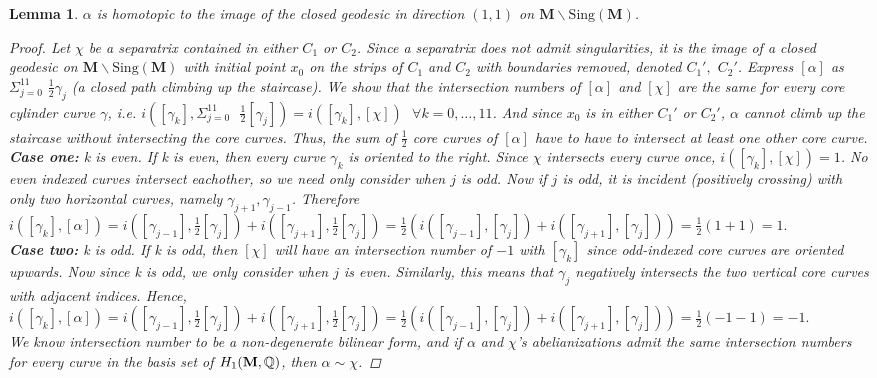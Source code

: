 \documentclass[]{article}
\newtheorem{lem}{Lemma}[section]
\begin{document}
\begin{lem}
$\alpha$ is homotopic to the image of the closed geodesic in direction $(1,1)$ on $\mathbf{M}\backslash\text{Sing}(\mathbf M)$.
\begin{proof}
Let $\chi$ be a separatrix contained in either $C_1$ or $C_2$. Since a separatrix does not admit singularities, it is the image of a closed geodesic on $\mathbf{M}\backslash\text{Sing}(\mathbf M)$ with initial point $x_0$ on the strips of $C_1$ and $C_2$ with boundaries removed, denoted $C_1',$ $C_2'$. Express $[\alpha]$ as $\Sigma^{11}_{j=0}$ $\frac{1}{2}\gamma_j$ (a closed path climbing up the staircase). We show that the intersection numbers of $[\alpha]$ and $[\chi]$ are the same for every core cylinder curve $\gamma$, i.e. $i([\gamma_k], \Sigma^{11}_{j=0} \text{ } \frac{1}{2}[\gamma_j])=i([\gamma_k],[\chi])\text{ } \forall k=0,\dots,11$. And since $x_0$ is in either $C_1'$ or $C_2'$, $\alpha$ cannot climb up the staircase without intersecting the core curves. Thus, the sum of $\frac{1}{2}$ core curves of $[\alpha]$ have to have to intersect at least one other core curve.   \\
\textbf{Case one:} k is even. If k is even, then every curve $\gamma_k$ is oriented to the right. Since $\chi$ intersects every curve once, $i([\gamma_k],[\chi])=1$. No even indexed curves intersect eachother, so we need only consider when $j$ is odd. Now if $j$ is odd, it is incident (positively crossing) with only two horizontal curves, namely $\gamma_{j+1},\gamma_{j-1}$. Therefore $i([\gamma_k],[\alpha])=i([\gamma_{j-1}],\frac{1}{2}[\gamma_{j}])+i([\gamma_{j+1}],\frac{1}{2}[\gamma_{j}])=\frac{1}{2}(i([\gamma_{j-1}],[\gamma_{j}])+i([\gamma_{j+1}],[\gamma_{j}]))=\frac{1}{2}(1+1)=1.$\\
\textbf{Case two:} k is odd. If k is odd, then $[\chi]$ will have an intersection number of $-1$ with $[\gamma_k]$ since odd-indexed core curves are oriented upwards. Now since k is odd, we only consider when $j$ is even. Similarly, this means that $\gamma_j$ negatively intersects the two vertical core curves with adjacent indices. Hence, $i([\gamma_k],[\alpha])=i([\gamma_{j-1}],\frac{1}{2}[\gamma_{j}])+i([\gamma_{j+1}],\frac{1}{2}[\gamma_{j}])=\frac{1}{2}(i([\gamma_{j-1}],[\gamma_{j}])+i([\gamma_{j+1}],[\gamma_{j}]))=\frac{1}{2}(-1-1)=-1.$\\
We know intersection number to be a non-degenerate bilinear form, and if $\alpha$ and $\chi$'s abelianizations admit the same intersection numbers for every curve in the basis set of $H_1(\textbf M, \mathbb{Q})$, then $\alpha\sim\chi$.
\end{proof}
\end{lem}
\end{document}
